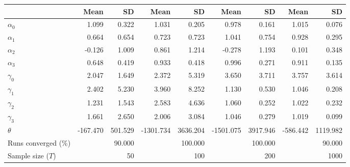 
\begin{tabular}[t]{lrrrrrrrr}
\toprule
  & Mean & SD & Mean  & SD  & Mean   & SD   & Mean    & SD   \\
\midrule
$\alpha_{0}$ & 1.099 & 0.322 & 1.031 & 0.205 & 0.978 & 0.161 & 1.015 & 0.076\\
$\alpha_{1}$ & 0.664 & 0.654 & 0.723 & 0.723 & 1.041 & 0.754 & 0.928 & 0.295\\
$\alpha_{2}$ & -0.126 & 1.009 & 0.861 & 1.214 & -0.278 & 1.193 & 0.101 & 0.348\\
$\alpha_{3}$ & 0.648 & 0.419 & 0.933 & 0.418 & 0.996 & 0.271 & 0.911 & 0.135\\
$\gamma_{0}$ & 2.047 & 1.649 & 2.372 & 5.319 & 3.650 & 3.711 & 3.757 & 3.614\\
$\gamma_{1}$ & 2.402 & 5.230 & 3.960 & 8.252 & 1.130 & 0.530 & 1.046 & 0.208\\
$\gamma_{2}$ & 1.231 & 1.543 & 2.583 & 4.636 & 1.060 & 0.252 & 1.022 & 0.232\\
$\gamma_{3}$ & 1.661 & 2.650 & 2.006 & 3.084 & 1.046 & 0.279 & 1.019 & 0.099\\
$\theta$ & -167.470 & 501.529 & -1301.734 & 3636.204 & -1501.075 & 3917.946 & -586.442 & 1119.982\\
Runs converged (\%) &  & 90.000 &  & 100.000 &  & 100.000 &  & 90.000\\
Sample size ($T$) &  & 50 &  & 100 &  & 200 &  & 1000\\
\bottomrule
\end{tabular}
